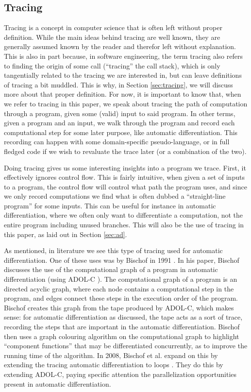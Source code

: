     \subsection{Tracing}
        Tracing is a concept in computer science that is often left without proper definition.
        While the main ideas behind tracing are well known, they are generally assumed known by the reader and therefor left without explanation.
        This is also in part because, in software engineering, the term tracing also refers to finding the origin of some call (``tracing'' the call stack), which is only tangentially related to the tracing we are interested in, but can leave definitions of tracing a bit muddled.
        This is why, in Section \ref{sec:tracing}, we will discuss more about that proper definition.
        For now, it is important to know that, when we refer to tracing in this paper, we speak about tracing the path of computation through a program, given some (valid) input to said program.
        In other terms, given a program and an input, we walk through the program and record each computational step for some later purpose, like automatic differentiation.
        This recording can happen with some domain-specific pseudo-language, or in full fledged code if we wish to revaluate the trace later (or a combination of the two).

        Doing tracing gives us some interesting insights into a program we trace.
        First, it effectively ignores control flow.
        This is fairly intuitive, when given a set of inputs to a program, the control flow will control what path the program uses, and since we only record computations we find what is often dubbed a ``straight-line program'' for some inputs.
        This can be useful for instance in automatic differentiation, where we often only want to differentiate a computation, not the entire program including unused branches.
        This will also be the use of tracing in this paper, as laid out in Section \ref{sec:ad}.

        As mentioned, in literature we see this type of tracing used for automatic differentiation.
        One of these uses was by Bischof in 1991 \cite{bischof1991issues}.
        In his paper, Bischof discusses the use of the computational graph of a program in automatic differentiation (using ADOL-C \cite{griewank1996algorithm}).
        The computational graph of a program is an directed acyclic graph, where each node contains a computational step in the program, and edges connect these steps in the execution order of the program.
        Bischof creates this graph from the tape produced by ADOL-C, which makes sense: for automatic differentiation as discussed, the tape acts as a sort of trace, recording the steps that are important in the automatic differentiation.
        Bischof then uses a graph colouring algorithm on the computational graph to highlight ``component functions'' that may be differentiated concurrently, as to improve the running time of the algorithm.
        In 2008, Bischof et al. expand on this by extending the tracing automatic differentiation to loops \cite{bischof2008parallel}.
        They do this by extending ADOL-C, paying specific attention the parallelization opportunities present in automatic differentiation.

